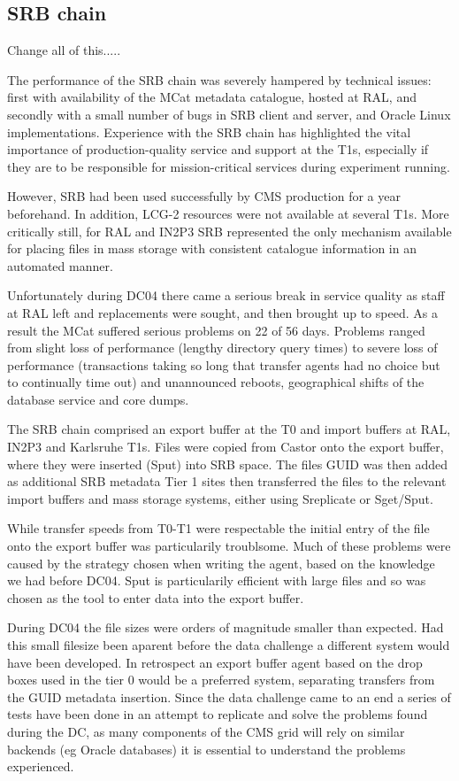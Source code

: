 \documentclass{cmspaper}
\begin{document}
\subsection{SRB chain}
Change all of this.....

The performance of the SRB chain was severely hampered by technical
issues: first with availability of the MCat metadata catalogue, hosted
at RAL, and secondly with a small number of bugs in SRB client and
server, and Oracle Linux implementations. Experience with the SRB
chain has highlighted the vital importance of production-quality
service and support at the T1s, especially if they are to be
responsible for mission-critical services during experiment running.

However, SRB had been used successfully by CMS production for a year
beforehand.  In addition, LCG-2 resources were not available at
several T1s. More critically still, for RAL and IN2P3 SRB represented
the only mechanism available for placing files in mass storage with
consistent catalogue information in an automated manner.

Unfortunately during DC04 there came a serious break in service
quality as staff at RAL left and replacements were sought, and then
brought up to speed.  As a result the MCat suffered serious problems
on 22 of 56 days. Problems ranged from slight loss of performance
(lengthy directory query times) to severe loss of performance
(transactions taking so long that transfer agents had no choice but to
continually time out) and unannounced reboots, geographical shifts of
the database service and core dumps.

The SRB chain comprised an export buffer at the T0 and import buffers
at RAL, IN2P3 and Karlsruhe T1s. Files were copied from Castor onto
the export buffer, where they were inserted (Sput) into SRB space. The
files GUID was then added as additional SRB metadata Tier 1 sites then
transferred the files to the relevant import buffers and mass storage
systems, either using Sreplicate or Sget/Sput.

While transfer speeds from T0-T1 were respectable %
 the initial entry of the file onto the export buffer was
particularily troublsome.  Much of these problems were caused by the
strategy chosen when writing the agent, based on the knowledge we had
before DC04. Sput is particularily efficient with large files and so
was chosen as the tool to enter data into the export buffer.

During DC04 the file sizes were orders of magnitude smaller than
expected. Had this small filesize been aparent before the data
challenge a different system would have been developed. In retrospect
an export buffer agent based on the drop boxes used in the tier 0
would be a preferred system, separating transfers from the GUID
metadata insertion.  Since the data challenge came to an end a series
of tests have been done in an attempt to replicate and solve the
problems found during the DC, as many components of the CMS grid will
rely on similar backends (eg Oracle databases) it is essential to
understand the problems experienced.
\end{document}
